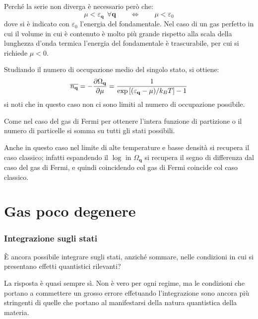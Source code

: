 Perché la serie non diverga è necessario però che:
\begin{equation*}
\mu < \varepsilon_{\textbf{q}} ~~\forall \textbf{q} \qquad \iff \qquad \mu < \varepsilon_0
\end{equation*}
dove si è indicato con $\varepsilon_0$ l'energia del fondamentale. Nel caso di un gas perfetto in cui il volume in cui è contenuto è molto più grande rispetto alla scala della lunghezza d'onda termica l'energia del fondamentale è trascurabile, per cui si richiede $\mu < 0$.

Studiando il numero di occupazione medio del singolo stato, si ottiene:
\begin{equation*}
\overline{n_{\textbf{q}}} = - \frac{\partial {\Omega_{\textbf{q}}}}{\partial {\mu}} = \frac{1}{ \exp\left[(\varepsilon_{\textbf{q}} - \mu)/k_B T\right] - 1}
\end{equation*}
si noti che in questo caso non ci sono limiti al numero di occupazione possibile.

Come nel caso del gas di Fermi per ottenere l'intera funzione di partizione o il numero di particelle si somma su tutti gli stati possibili.

Anche in questo caso nel limite di alte temperature e basse densità si recupera il caso classico; infatti espandendo il $\log$ in $\Omega_{\textbf{q}}$ si recupera il segno di differenza dal caso del gas di Fermi, e quindi coincidendo col gas di Fermi coincide col caso classico.

\section{Gas poco degenere}
\label{sec:fewdegas}

\subsubsection{Integrazione sugli stati}
\`E ancora possibile integrare sugli stati, anziché sommare, nelle condizioni in cui si presentano effetti quantistici rilevanti?

\noindent La risposta è quasi sempre sì. Non è vero per ogni regime, ma le condizioni che portano a commettere un grosso errore effetuando l'integrazione sono ancora più stringenti di quelle che portano al manifestarsi della natura quantistica della materia.

